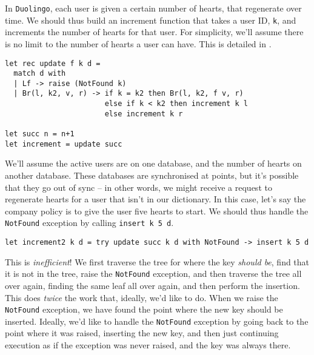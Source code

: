 In \texttt{Duolingo}, each user is given a certain number of hearts, that regenerate over time. We should thus build an increment function that takes a user ID, \texttt{k}, and increments the number of hearts for that user. For simplicity, we'll assume there is no limit to the number of hearts a user can have. This is detailed in .

\begin{code}
\label{code:ocaml-increment}
\begin{verbatim}
let rec update f k d =
  match d with
  | Lf -> raise (NotFound k)
  | Br(l, k2, v, r) -> if k = k2 then Br(l, k2, f v, r)
                       else if k < k2 then increment k l
                       else increment k r
                       
let succ n = n+1                   
let increment = update succ
\end{verbatim}
\end{code}

We'll assume the active users are on one database, and the number of hearts on another database. These databases are synchronised at points, but it's possible that they go out of sync -- in other words, we might receive a request to regenerate hearts for a user that isn't in our dictionary. In this case, let's say the company policy is to give the user five hearts to start. We should thus handle the \texttt{NotFound} exception by calling \texttt{insert k 5 d}. 

\begin{code}
\label{code:ocaml-inefficient-update}
\begin{verbatim}   
let increment2 k d = try update succ k d with NotFound -> insert k 5 d
\end{verbatim}
\end{code}

This is \textit{inefficient}! We first traverse the tree for where the key \textit{should be}, find that it is not in the tree, raise the \texttt{NotFound} exception, and then traverse the tree all over again, finding the same leaf all over again, and then perform the insertion. This does \textit{twice} the work that, ideally, we'd like to do. When we raise the \texttt{NotFound} exception, we have found the point where the new key should be inserted. Ideally, we'd like to handle the \texttt{NotFound} exception by going back to the point where it was raised, inserting the new key, and then just continuing execution as if the exception was never raised, and the key was always there.

